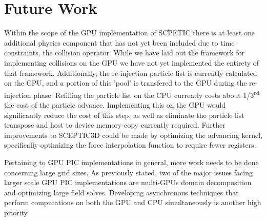 \section{Future Work}
Within the scope of the GPU implementation of SCPETIC there is at least one additional physics component that has not yet been included due to time constraints, the collision operator. While we have laid out the framework for implementing collisions on the GPU we have not yet implemented the entirety of that framework. Additionally, the re-injection particle list is currently calculated on the CPU, and a portion of this 'pool' is transfered to the GPU during the re-injection phase. Refilling the particle list on the CPU currently costs about 1/3\textsuperscript{rd} the cost of the particle advance. Implementing this on the GPU would significantly reduce the cost of this step, as well as eliminate the particle list transpose and host to device memory copy currently required. Further improvements to SCEPTIC3D could be made by optimizing the advancing kernel, specifically optimizing the force interpolation function to require fewer registers. 

Pertaining to GPU PIC implementations in general, more work needs to be done concerning large grid sizes. As previously stated, two of the major issues facing larger scale GPU PIC implementations are multi-GPUs domain decomposition and optimizing large field solves. Developing asynchronous techniques that perform computations on both the GPU and CPU simultaneously is another high priority. 



